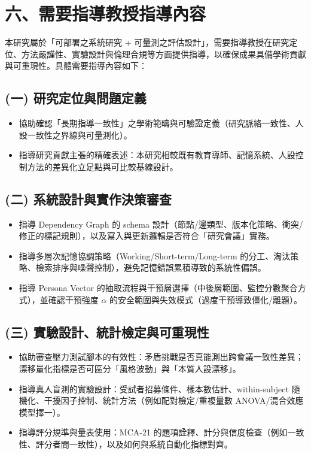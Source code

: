 \section*{六、需要指導教授指導內容}

本研究屬於「可部署之系統研究 + 可量測之評估設計」，需要指導教授在研究定位、方法嚴謹性、實驗設計與倫理合規等方面提供指導，以確保成果具備學術貢獻與可重現性。具體需要指導內容如下：

\subsection*{(一) 研究定位與問題定義}
\begin{itemize}
  \item 協助確認「長期指導一致性」之學術範疇與可驗證定義（研究脈絡一致性、人設一致性之界線與可量測化）。
  \item 指導研究貢獻主張的精確表述：本研究相較既有教育導師、記憶系統、人設控制方法的差異化立足點與可比較基線設計。
\end{itemize}

\subsection*{(二) 系統設計與實作決策審查}
\begin{itemize}
  \item 指導 Dependency Graph 的 schema 設計（節點/邊類型、版本化策略、衝突/修正的標記規則），以及寫入與更新邏輯是否符合「研究會議」實務。
  \item 指導多層次記憶協調策略（Working/Short-term/Long-term 的分工、淘汰策略、檢索排序與噪聲控制），避免記憶錯誤累積導致的系統性偏誤。
  \item 指導 Persona Vector 的抽取流程與干預層選擇（中後層範圍、監控分數聚合方式），並確認干預強度 $\alpha$ 的安全範圍與失效模式（過度干預導致僵化/離題）。
\end{itemize}

\subsection*{(三) 實驗設計、統計檢定與可重現性}
\begin{itemize}
  \item 協助審查壓力測試腳本的有效性：矛盾挑戰是否真能測出跨會議一致性差異；漂移量化指標是否可區分「風格波動」與「本質人設漂移」。
  \item 指導真人盲測的實驗設計：受試者招募條件、樣本數估計、within-subject 隨機化、干擾因子控制、統計方法（例如配對檢定/重複量數 ANOVA/混合效應模型擇一）。
  \item 指導評分規準與量表使用：MCA-21 的題項詮釋、計分與信度檢查（例如一致性、評分者間一致性），以及如何與系統自動化指標對齊。
\end{itemize}

